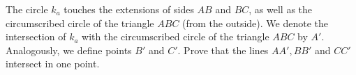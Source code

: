The circle $k_a$ touches the extensions of sides $AB$ and $BC$, as well as the circumscribed circle of the triangle $ABC$ (from the outside). We denote the intersection of $k_a$ with the circumscribed circle of the triangle $ABC$ by $A'$. Analogously, we define points $B'$ and $C'$. Prove that the lines $AA',BB'$ and $CC'$ intersect in one point.